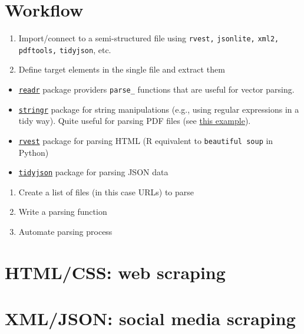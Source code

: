\documentclass[
]{book}
\begin{document}
\hypertarget{workflow-2}{%
\section{Workflow}\label{workflow-2}}

\begin{enumerate}
\def\labelenumi{\arabic{enumi}.}
\item
  Import/connect to a semi-structured file using \texttt{rvest,} \texttt{jsonlite,} \texttt{xml2,} \texttt{pdftools,} \texttt{tidyjson}, etc.
\item
  Define target elements in the single file and extract them
\end{enumerate}

\begin{itemize}
\item
  \href{https://readr.tidyverse.org/}{\texttt{readr}} package providers \texttt{parse\_} functions that are useful for vector parsing.
\item
  \href{https://stringr.tidyverse.org/}{\texttt{stringr}} package for string manipulations (e.g., using regular expressions in a tidy way). Quite useful for parsing PDF files (see \href{https://themockup.blog/posts/2020-04-03-beer-and-pdftools-a-vignette/}{this example}).
\item
  \href{https://github.com/tidyverse/rvest}{\texttt{rvest}} package for parsing HTML (R equivalent to \texttt{beautiful\ soup} in Python)
\item
  \href{https://github.com/sailthru/tidyjson}{\texttt{tidyjson}} package for parsing JSON data
\end{itemize}

\begin{enumerate}
\def\labelenumi{\arabic{enumi}.}
\setcounter{enumi}{2}
\item
  Create a list of files (in this case URLs) to parse
\item
  Write a parsing function
\item
  Automate parsing process
\end{enumerate}

\hypertarget{htmlcss-web-scraping}{%
\section{HTML/CSS: web scraping}\label{htmlcss-web-scraping}}

\hypertarget{xmljson-social-media-scraping}{%
\section{XML/JSON: social media scraping}\label{xmljson-social-media-scraping}}
\end{document}
